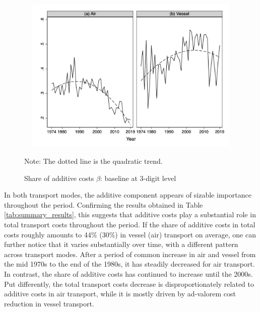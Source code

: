 \documentclass[a4paper,11pt]{article}
\begin{document}
\begin{figure}[htbp]
\caption{Share of additive costs $\beta$: baseline at 3-digit level}
\label{fig:part_cout_additif}
\begin{center}
 \includegraphics[width=12cm, height=7.5cm]{Figure1_share_of_additive_in_totalTC.jpg}
\begin{minipage} [c]  {5in} \scriptsize%
Note: The dotted line is the quadratic trend.
\end{minipage}
\end{center}
\end{figure}


%


In both transport modes, the additive component appears of sizable importance throughout the period.
Confirming the results obtained in Table \ref{tab:summary_results}, this suggests that additive costs play a substantial role in total transport costs throughout the period. If the share of additive costs in total costs roughly amounts to 44\% (30\%) in vessel (air) transport on average, one can further notice that it varies substantially over time, with a different pattern across transport modes. After a period of common increase in air and vessel from the mid 1970s to the end of the 1980s, it has steadily decreased for air transport. In contrast, the share of additive costs has continued to increase until the 2000s. Put differently, the total transport costs decrease is disproportionately related to additive costs in air transport, while it is mostly driven by ad-valorem cost reduction in vessel transport.\smallskip
\end{document}
